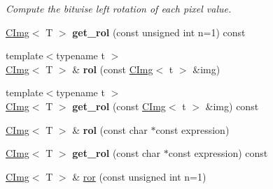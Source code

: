 \begin{DoxyCompactItemize}
\begin{DoxyCompactList}\small\item\em Compute the bitwise left rotation of each pixel value. \item\end{DoxyCompactList}\item 
\hypertarget{structcimg__library_1_1CImg_adce6aae85f38137281e73e257d42def8}{
\hyperlink{structcimg__library_1_1CImg}{CImg}$<$ T $>$ {\bfseries get\_\-rol} (const unsigned int n=1) const }
\label{structcimg__library_1_1CImg_adce6aae85f38137281e73e257d42def8}

\item 
\hypertarget{structcimg__library_1_1CImg_a62b0d66028eeb9a34d81d51e8d8bf5fe}{
{\footnotesize template$<$typename t $>$ }\\\hyperlink{structcimg__library_1_1CImg}{CImg}$<$ T $>$ \& {\bfseries rol} (const \hyperlink{structcimg__library_1_1CImg}{CImg}$<$ t $>$ \&img)}
\label{structcimg__library_1_1CImg_a62b0d66028eeb9a34d81d51e8d8bf5fe}

\item 
\hypertarget{structcimg__library_1_1CImg_aed6d2e45ae7ec42d5d81818bc5459b0c}{
{\footnotesize template$<$typename t $>$ }\\\hyperlink{structcimg__library_1_1CImg}{CImg}$<$ T $>$ {\bfseries get\_\-rol} (const \hyperlink{structcimg__library_1_1CImg}{CImg}$<$ t $>$ \&img) const }
\label{structcimg__library_1_1CImg_aed6d2e45ae7ec42d5d81818bc5459b0c}

\item 
\hypertarget{structcimg__library_1_1CImg_a9671b21247cdb92faa079c4bcb788e77}{
\hyperlink{structcimg__library_1_1CImg}{CImg}$<$ T $>$ \& {\bfseries rol} (const char $\ast$const expression)}
\label{structcimg__library_1_1CImg_a9671b21247cdb92faa079c4bcb788e77}

\item 
\hypertarget{structcimg__library_1_1CImg_ac24825f896224aab6292cb4b4d41c26d}{
\hyperlink{structcimg__library_1_1CImg}{CImg}$<$ T $>$ {\bfseries get\_\-rol} (const char $\ast$const expression) const }
\label{structcimg__library_1_1CImg_ac24825f896224aab6292cb4b4d41c26d}

\item 
\hypertarget{structcimg__library_1_1CImg_aa67ed118255341b95377e886300f15e4}{
\hyperlink{structcimg__library_1_1CImg}{CImg}$<$ T $>$ \& \hyperlink{structcimg__library_1_1CImg_aa67ed118255341b95377e886300f15e4}{ror} (const unsigned int n=1)}
\label{structcimg__library_1_1CImg_aa67ed118255341b95377e886300f15e4}


\end{DoxyCompactItemize}
